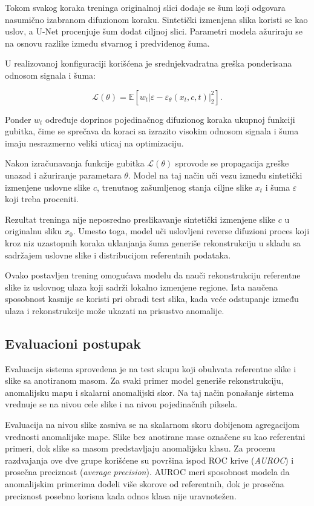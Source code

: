 \documentclass[10pt]{article}
\begin{document}
	Tokom svakog koraka treninga originalnoj slici dodaje se šum koji odgovara nasumično izabranom difuzionom koraku. Sintetički izmenjena slika koristi se kao uslov, a U-Net procenjuje šum dodat ciljnoj slici. Parametri modela ažuriraju se na osnovu razlike između stvarnog i predviđenog šuma.
	
	U realizovanoj konfiguraciji korišćena je srednjekvadratna greška ponderisana odnosom signala i šuma:
	
	$$
	\mathcal{L}(\theta) = 
	\mathbb{E}
	\left[
	w_t
	\left|
	\varepsilon-
	\varepsilon_{\theta}(x_t,c,t)
	\right|_2^2
	\right].
	$$ \newline
	
	Ponder $w_t$ određuje doprinos pojedinačnog difuzionog koraka ukupnoj funkciji gubitka, čime se sprečava da koraci sa izrazito visokim odnosom signala i šuma imaju nesrazmerno veliki uticaj na optimizaciju.
	
	Nakon izračunavanja funkcije gubitka $\mathcal{L}(\theta)$ sprovode se propagacija greške unazad i ažuriranje parametara $\theta$. Model na taj način uči vezu između sintetički izmenjene uslovne slike $c$, trenutnog zašumljenog stanja ciljne slike $x_t$ i šuma $\varepsilon$ koji treba proceniti.
	
	Rezultat treninga nije neposredno preslikavanje sintetički izmenjene slike $c$ u originalnu sliku $x_0$. Umesto toga, model uči uslovljeni reverse difuzioni proces koji kroz niz uzastopnih koraka uklanjanja šuma generiše rekonstrukciju u skladu sa sadržajem uslovne slike i distribucijom referentnih podataka.
	
	Ovako postavljen trening omogućava modelu da nauči rekonstrukciju referentne slike iz uslovnog ulaza koji sadrži lokalno izmenjene regione. Ista naučena sposobnost kasnije se koristi pri obradi test slika, kada veće odstupanje između ulaza i rekonstrukcije može ukazati na prisustvo anomalije.
	
	\subsection{Evaluacioni postupak}
	
	Evaluacija sistema sprovedena je na test skupu koji obuhvata referentne slike i slike sa anotiranom masom. Za svaki primer model generiše rekonstrukciju, anomalijsku mapu i skalarni anomalijski skor. Na taj način ponašanje sistema vrednuje se na nivou cele slike i na nivou pojedinačnih piksela.
	
	Evaluacija na nivou slike zasniva se na skalarnom skoru dobijenom agregacijom vrednosti anomalijske mape. Slike bez anotirane mase označene su kao referentni primeri, dok slike sa masom predstavljaju anomalijsku klasu. Za procenu razdvajanja ove dve grupe korišćene su površina ispod ROC krive (\textit{AUROC}) i prosečna preciznost (\textit{average precision}). AUROC meri sposobnost modela da anomalijskim primerima dodeli više skorove od referentnih, dok je prosečna preciznost posebno korisna kada odnos klasa nije uravnotežen.
	
\end{document}
